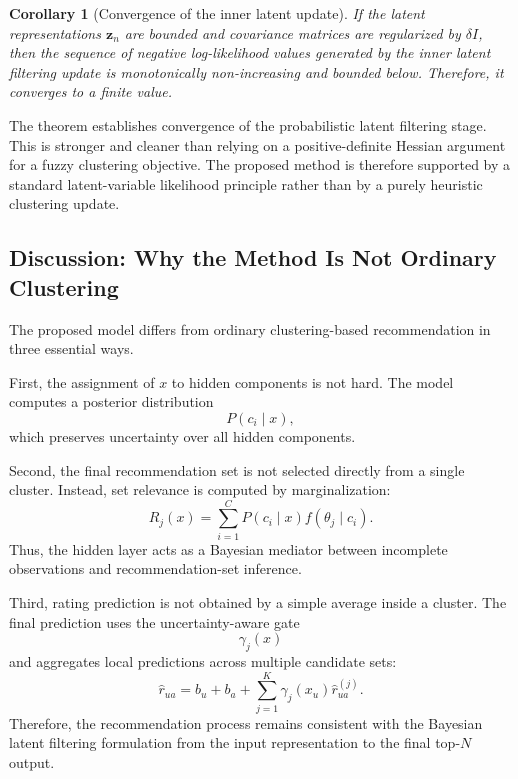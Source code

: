 \documentclass{article}
\theoremstyle{plain}
\newtheorem{corollary}{Corollary}      %
\theoremstyle{definition}
\theoremstyle{remark}
\begin{document}
\begin{corollary}[Convergence of the inner latent update]
	\label{cor:inner_convergence}
	If the latent representations \(\mathbf z_n\) are bounded and covariance matrices are regularized by \(\delta I\), then the sequence of negative log-likelihood values generated by the inner latent filtering update is monotonically non-increasing and bounded below. Therefore, it converges to a finite value.
\end{corollary}

The theorem establishes convergence of the probabilistic latent filtering stage. This is stronger and cleaner than relying on a positive-definite Hessian argument for a fuzzy clustering objective. The proposed method is therefore supported by a standard latent-variable likelihood principle rather than by a purely heuristic clustering update.

\subsection{Discussion: Why the Method Is Not Ordinary Clustering}
\label{subsec:not_ordinary_clustering}

The proposed model differs from ordinary clustering-based recommendation in three essential ways.

First, the assignment of \(x\) to hidden components is not hard. The model computes a posterior distribution
\[
P(c_i\mid x),
\]
which preserves uncertainty over all hidden components.

Second, the final recommendation set is not selected directly from a single cluster. Instead, set relevance is computed by marginalization:
\[
R_j(x)
=
\sum_{i=1}^{C}
P(c_i\mid x)f(\theta_j\mid c_i).
\]
Thus, the hidden layer acts as a Bayesian mediator between incomplete observations and recommendation-set inference.

Third, rating prediction is not obtained by a simple average inside a cluster. The final prediction uses the uncertainty-aware gate
\[
\gamma_j(x)
\]
and aggregates local predictions across multiple candidate sets:
\[
\widehat r_{ua}
=
b_u+b_a+
\sum_{j=1}^{K}
\gamma_j(x_u)\widehat r_{ua}^{(j)}.
\]
Therefore, the recommendation process remains consistent with the Bayesian latent filtering formulation from the input representation to the final top-\(N\) output.
\end{document}
